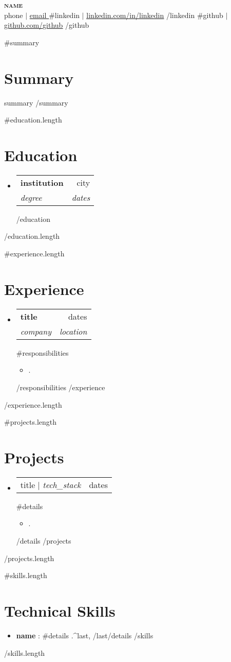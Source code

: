 \documentclass[letterpaper,11pt]{article}
\newcommand{\resumeItem}[1]{
  \item\small{
    {#1 \vspace{-2pt}}
  }
}
\newcommand{\resumeSubheading}[4]{
  \vspace{-2pt}\item
    \begin{tabularx}{\textwidth}{Xr}
      \textbf{#1} & #2 \\
      \textit{\small#3} & \textit{\small #4} \\
    \end{tabularx}\vspace{-7pt}
}
\newcommand{\resumeProjectHeading}[2]{
    \item
    \begin{tabularx}{\textwidth}{Xr}
      \small#1 & #2 \\
    \end{tabularx}\vspace{-7pt}
}
\newcommand{\resumeSubHeadingListStart}{\begin{itemize}[leftmargin=0.15in, label={}]}
\newcommand{\resumeSubHeadingListEnd}{\end{itemize}}
\newcommand{\resumeItemListStart}{\begin{itemize}}
\newcommand{\resumeItemListEnd}{\end{itemize}\vspace{-12pt}}
\begin{document}
\begin{center}
    \textbf{\Huge \scshape {{name}}} \\ \vspace{1pt}
    \small {{phone}} $|$ \href{mailto:{{email}}}{\underline{ {{email}} }} 
    {{#linkedin}} $|$ \href{https://linkedin.com/in/{{linkedin}}}{\underline{linkedin.com/in/{{linkedin}}}} {{/linkedin}}
    {{#github}} $|$ \href{https://github.com/{{github}}}{\underline{github.com/{{github}}}} {{/github}}
\end{center}

{{#summary}}
\section{Summary}
{{summary}}
{{/summary}}

{{#education.length}}
\section{Education}
  \resumeSubHeadingListStart
  {{#education}}
    \resumeSubheading
      { {{institution}} }{ {{city}} }
      { {{degree}} }{ {{dates}} }
  {{/education}}
  \resumeSubHeadingListEnd
{{/education.length}}

{{#experience.length}}
\section{Experience}
  \resumeSubHeadingListStart
  {{#experience}}
    \resumeSubheading
      { {{title}} }{ {{dates}} }
      { {{company}} }{ {{location}} }
      {{#responsibilities}}
      \resumeItemListStart
        \resumeItem{ {{.}} }
      \resumeItemListEnd
      {{/responsibilities}}
  {{/experience}}
  \resumeSubHeadingListEnd
{{/experience.length}}

{{#projects.length}}
\section{Projects}
  \resumeSubHeadingListStart
  {{#projects}}
    \resumeProjectHeading
      { {{title}} $|$ \emph{ {{tech_stack}} } }{ {{dates}} }
      {{#details}}
      \resumeItemListStart
        \resumeItem{ {{.}} }
      \resumeItemListEnd
      {{/details}}
  {{/projects}}
  \resumeSubHeadingListEnd
{{/projects.length}}

{{#skills.length}}
\section{Technical Skills}
  \resumeSubHeadingListStart
  {{#skills}}
    \item \textbf{ {{name}} } : {{#details}} {{.}}{{^last}}, {{/last}}{{/details}}
  {{/skills}}
  \resumeSubHeadingListEnd
{{/skills.length}}
\end{document}
